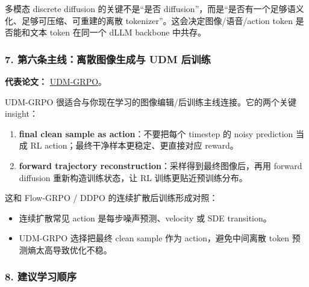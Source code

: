 \begin{summarybox}
多模态 discrete diffusion 的关键不是“是否 diffusion”，而是“是否有一个足够语义化、足够可压缩、可重建的离散 tokenizer”。这会决定图像/语音/action token 是否能和文本 token 在同一个 dLLM backbone 中共存。
\end{summarybox}

\subsubsection{7. 第六条主线：离散图像生成与 UDM 后训练}

\textbf{代表论文：} \href{https://arxiv.org/abs/2604.18518}{UDM-GRPO}。

UDM-GRPO 很适合与你现在学习的图像编辑/后训练主线连接。它的两个关键 insight：

\begin{enumerate}[leftmargin=1.5em]
  \item \textbf{final clean sample as action}：不要把每个 timestep 的 noisy prediction 当成 RL action；最终干净样本更稳定、更直接对应 reward。
  \item \textbf{forward trajectory reconstruction}：采样得到最终图像后，再用 forward diffusion 重新构造训练状态，让 RL 训练更贴近预训练分布。
\end{enumerate}

这和 Flow-GRPO / DDPO 的连续扩散后训练形成对照：

\begin{itemize}[leftmargin=1.5em]
  \item 连续扩散常见 action 是每步噪声预测、velocity 或 SDE transition。
  \item UDM-GRPO 选择把最终 clean sample 作为 action，避免中间离散 token 预测熵太高导致优化不稳。
\end{itemize}

\subsubsection{8. 建议学习顺序}

